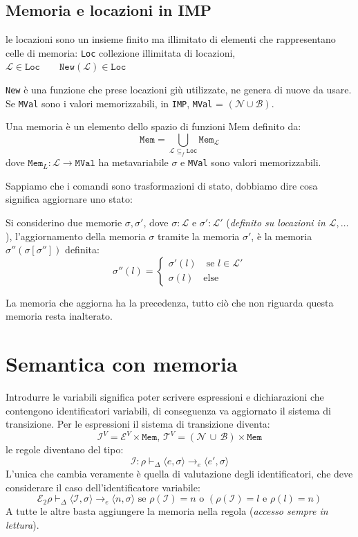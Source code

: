 \documentclass[oneside,a4paper,11pt]{book}
\theoremstyle{italicstyle}
\theoremstyle{normStyle}
\begin{document}
\subsection{Memoria e locazioni in IMP}
\begin{tcolorbox}[title = {Locazioni}]
  le locazioni sono un insieme finito ma illimitato di elementi che rappresentano celle di memoria:
  \verb|Loc| collezione illimitata di locazioni, $\mathcal{L} \in \texttt{Loc}\qquad\texttt{New}(\mathcal{L})\in \texttt{Loc}$

  \verb|New| è una funzione che prese locazioni giù utilizzate, ne genera di nuove da usare. Se \verb|MVal| 
  sono i valori memorizzabili, in \verb|IMP|, \verb|MVal| = $(\mathcal{N}\cup \mathcal{B})$.
\end{tcolorbox}
\begin{tcolorbox}[title = {Memoria}]
  Una memoria è un elemento dello spazio di funzioni Mem definito da: 
  \[
    \texttt{Mem} = \bigcup_{\mathcal{L}\subseteq_f \texttt{Loc}}\texttt{Mem}_\mathcal{L}
  \]
dove $\texttt{Mem}_L : \mathcal{L} \rightarrow \texttt{MVal}$ ha metavariabile $\sigma$ e
\verb|MVal| sono valori memorizzabili.
\end{tcolorbox}
Sappiamo che i comandi sono trasformazioni di stato, dobbiamo dire cosa significa aggiornare uno stato:
\begin{tcolorbox}[title = {Aggiornamento di stato}]
  Si considerino due memorie $\sigma, \sigma'$, dove $\sigma : \mathcal{L}$ e 
  $\sigma' : \mathcal{L}'$ (\textit{definito su locazioni in $\mathcal{L}, \dots$}),
  l'aggiornamento della memoria $\sigma$ tramite la memoria $\sigma'$, è la memoria 
  $\sigma''(\sigma[\sigma''])$ definita:
  \[
    \sigma''(l)=
    \begin{cases}
      \sigma'(l)\quad\text{se }l\in \mathcal{L}' \\
      \sigma(l)\quad\text{else}
    \end{cases}
  \]
\end{tcolorbox}
La memoria che aggiorna ha la precedenza, tutto ciò che non riguarda questa memoria 
resta inalterato.
\section{Semantica con memoria}
Introdurre le variabili significa poter scrivere espressioni e dichiarazioni che 
contengono identificatori variabili, di conseguenza va aggiornato il sistema di transizione. 
Per le espressioni il sistema di transizione diventa:
\[
  \mathcal{I}^V=\mathcal{E}^V \times \texttt{Mem},\,\mathcal{T}^V = (\mathcal{N}\,\cup\,\mathcal{B})\times\texttt{Mem}
\]
le regole diventano del tipo:
\[
  \mathcal{I}: \rho \vdash_\Delta \langle e,\sigma \rangle \rightarrow_e \langle e',\sigma \rangle
\]
L'unica che cambia veramente è quella di valutazione degli identificatori, che deve 
considerare il caso dell'identificatore variabile:
\[
  \mathcal{E}_2 \rho \vdash_\Delta \langle \mathcal{I},\sigma \rangle
  \rightarrow_e \langle n,\sigma \rangle \text{ se }\rho(\mathcal{I})=n 
  \text{ o }(\rho(\mathcal{I})=l \text{ e }\rho({l})=n)
\]
A tutte le altre basta aggiungere la memoria nella regola (\textit{accesso 
sempre in lettura}).
\end{document}
